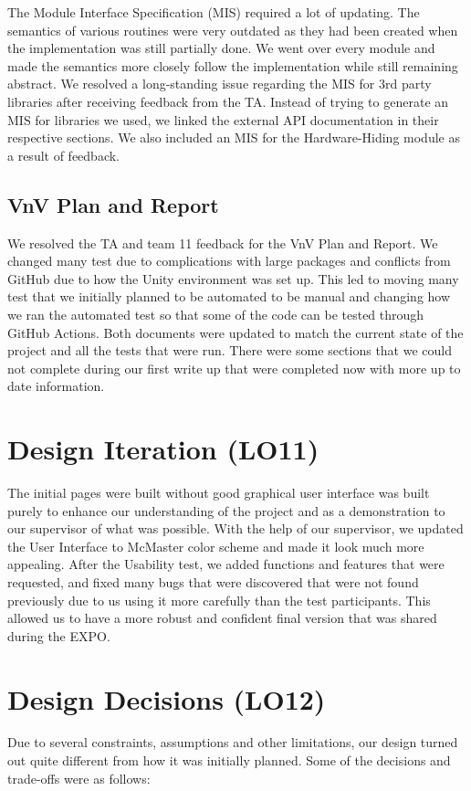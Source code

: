 \documentclass{article}
\begin{document}
The Module Interface Specification (MIS) required a lot of updating. The semantics of various routines were very outdated as they had been created when the implementation was still partially done. We went over every module and made the semantics more closely follow the implementation while still remaining abstract. We resolved a long-standing issue regarding the MIS for 3rd party libraries after receiving feedback from the TA. Instead of trying to generate an MIS for libraries we used, we linked the external API documentation in their respective sections. We also included an MIS for the Hardware-Hiding module as a result of feedback.

\subsection{VnV Plan and Report}

We resolved the TA and team 11 feedback for the VnV Plan and Report. We changed many test due to complications with large packages and conflicts from GitHub due to how the Unity environment was set up. This led to moving many test that we initially planned to be automated to be manual and changing how we ran the automated test so that some of the code can be tested through GitHub Actions. Both documents were updated to match the current state of the project and all the tests that were run. There were some sections that we could not complete during our first write up that were completed now with more up to date information.

\section{Design Iteration (LO11)}
The initial pages were built without good graphical user interface was built purely to enhance our understanding of the project and as a demonstration to our supervisor of what was possible. With the help of our supervisor, we updated the User Interface to McMaster color scheme and made it look much more appealing. After the Usability test, we added functions and features that were requested, and fixed many bugs that were discovered that were not found previously due to us using it more carefully than the test participants. This allowed us to have a more robust and confident final version that was shared during the EXPO.

\section{Design Decisions (LO12)}
Due to several constraints, assumptions and other limitations, our design turned out quite different from how it was initially planned. Some of the decisions and trade-offs were as follows:
\end{document}
